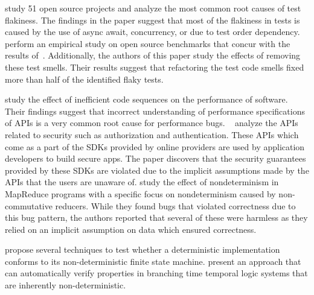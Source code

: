 \cite{LuoHEM2014} study 51 open source projects and analyze the most common root causes of
test flakiness. The findings in the paper suggest that most of the flakiness in tests is caused by
the use of async await, concurrency, or due to test order dependency.~\cite{Plotkin:1993:LPP:645891.671433}
perform an empirical study on open source benchmarks that concur with the results of~\cite{LuoHEM2014}.
Additionally, the authors of this paper study the effects of removing these test smells. Their results suggest that
refactoring the test code smells fixed more than half of the identified flaky tests.

\cite{Jin:2012:UDR:2254064.2254075} study the effect of inefficient code sequences on the performance of software.
Their findings suggest that incorrect understanding of performance specifications of APIs is a very common root cause for
performance bugs. ~\cite{Rui:2013:180377} analyze the APIs related to security such as authorization and authentication.
These APIs which come as a part of the SDKs provided by online providers are used by application developers to 
build secure apps. The paper discovers that the security guarantees provided by these SDKs are violated due to
the implicit assumptions made by the APIs that the users are unaware of. \cite{Xiao:2014:NMC:2591062.2591177}
study the effect of nondeterminism in MapReduce programs with a specific focus on nondeterminism caused by
non-commutative reducers. While they found bugs that violated correctness due to this bug pattern,
the authors reported that several of these were harmless as they relied on an implicit assumption on data
which ensured correctness. 

\cite{Petrenko1996,Petrenko:1993:NSM:648128.761244,Savor:1997:639710,Hierons:2004:TCD:1040993.1040998} propose several techniques to test whether a
deterministic implementation conforms to its non-deterministic finite state machine.
\cite{Cook:2013:RNP:2491956.2491969} present an approach that can automatically verify properties
in branching time temporal logic systems that are inherently non-deterministic.


